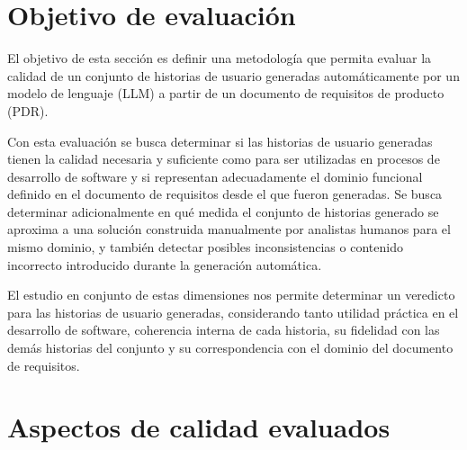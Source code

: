 \section{Objetivo de evaluación}
El objetivo de esta sección es definir una metodología que permita evaluar la calidad de un conjunto de historias de usuario generadas automáticamente por un modelo de lenguaje (LLM) a partir de un documento de requisitos de producto (PDR).

Con esta evaluación se busca determinar si las historias de usuario generadas tienen la calidad necesaria y suficiente como para ser utilizadas en procesos de desarrollo de software y si representan adecuadamente el dominio funcional definido en el documento de requisitos desde el que fueron generadas. Se busca determinar adicionalmente en qué medida el conjunto de historias generado se aproxima a una solución construida manualmente por analistas humanos para el mismo dominio, y también detectar posibles inconsistencias o contenido incorrecto introducido durante la generación automática.

El estudio en conjunto de estas dimensiones nos permite determinar un veredicto para las historias de usuario generadas, considerando tanto utilidad práctica en el desarrollo de software, coherencia interna de cada historia, su fidelidad con las demás historias del conjunto y su correspondencia con el dominio del documento de requisitos.

\section{Aspectos de calidad evaluados}

